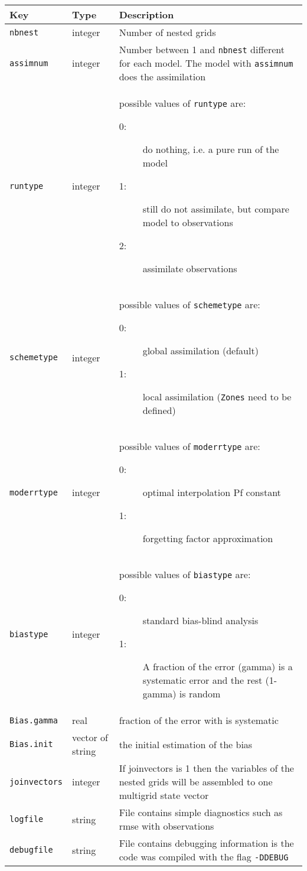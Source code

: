 \documentclass[a4paper,12pt]{article}
\newcommand{\code}{\texttt}
\newenvironment{keytabular}{\begin{tabular}{|p{0.3\textwidth}|p{0.2\textwidth}|p{0.5\textwidth}|} \hline Key & Type & Description \\ \hline \hline }{\end{tabular}}
\begin{document}
\begin{keytabular}
\code{nbnest} & integer &  Number of nested grids 
\\
\code{assimnum} & integer & Number between 1 and \code{nbnest}
different for each model. The model with \code{assimnum} does the assimilation
\\
\code{runtype} & integer & 
possible values of \code{runtype} are:
\begin{description}
\item[0:] do nothing, i.e. a pure run of the model  
\item[1:] still do not assimilate, but compare model to observations
\item[2:] assimilate observations
\end{description}
\\
\code{schemetype} & integer &
possible values of \code{schemetype} are:
\begin{description}
\item[0:] global assimilation (default)
\item[1:] local assimilation (\code{Zones} need to be defined)
\end{description}
\\
\code{moderrtype} & integer &
possible values of \code{moderrtype} are:
\begin{description}
\item[0:] optimal interpolation Pf constant
\item[1:] forgetting factor approximation
\end{description}
\\
\code{biastype} & integer &
possible values of \code{biastype} are: 
\begin{description}
\item[0:] standard bias-blind analysis
\item[1:]  A fraction of the error (gamma) is a systematic error 
and the rest (1-gamma) is random \citep{dee98}
\end{description}
\\
\code{Bias.gamma} & real & fraction of the error with is systematic
\\
\code{Bias.init} & vector of string & the initial estimation of the bias
\\
\code{joinvectors} & integer & If joinvectors is 1 then the variables of the nested grids will be assembled to one multigrid state vector
\\
\code{logfile} & string & File contains simple diagnostics such as rmse with observations 
\\
\code{debugfile} & string & 
File contains debugging information is the code was compiled with the flag \code{-DDEBUG}
\\
\hline
\end{keytabular}
\end{document}
